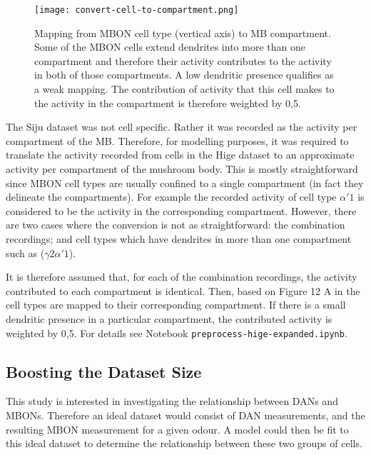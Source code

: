 \documentclass[11pt, A4]{article}
\begin{document}
\begin{multicols}{2}
\begin{figure}[H]
	\centering
	\texttt{[image: convert-cell-to-compartment.png]}
	\caption{Mapping from MBON cell type (vertical axis) to MB compartment. Some of the MBON cells extend dendrites into more than one compartment and therefore their activity contributes to the activity in both of those compartments. A low dendritic presence qualifies as a weak mapping. The contribution of activity that this cell makes to the activity in the compartment is therefore weighted by 0,5.}
	\label{fig:convert-cell-to-compartment}
\end{figure}



The Siju dataset was not cell specific. Rather it was recorded as the activity per compartment of the MB. Therefore, for modelling purposes, it was required to translate the activity recorded from cells in the Hige dataset to an approximate activity per compartment of the mushroom body. This is mostly straightforward since MBON cell types are usually confined to a single compartment (in fact they delineate the compartments). For example the recorded activity of cell type $\alpha'1$ is considered to be the activity in the corresponding compartment. However, there are two cases where the conversion is not as straightforward: the combination recordings; and cell types which have dendrites in more than one compartment such as ($\gamma 2 \alpha'1$).

It is therefore assumed that, for each of the combination recordings, the activity contributed to each compartment is identical. Then, based on Figure 12 A in \cite{aso2014neuronal} the cell types are mapped to their corresponding compartment. If there is a small dendritic presence in a particular compartment, the contributed activity is weighted by 0,5. For details see Notebook \texttt{preprocess-hige-expanded.ipynb}.

		
	
\subsection{Boosting the Dataset Size}

This study is interested in investigating the relationship between DANs and MBONs. Therefore an ideal dataset would consist of DAN measurements, and the resulting MBON measurement for a given odour. A model could then be fit to this ideal dataset to determine the relationship between these two groups of cells.


\end{multicols}
\end{document}
